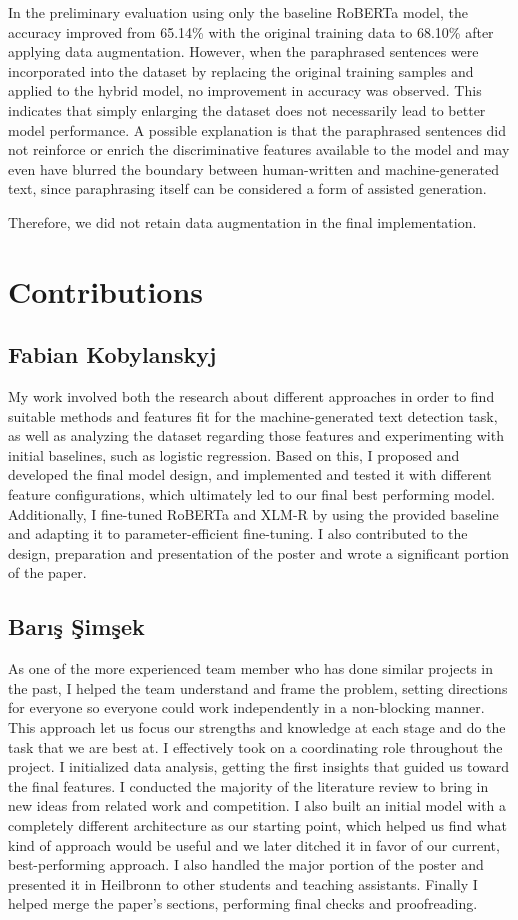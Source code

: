 \documentclass[11pt]{article}
\begin{document}
In the preliminary evaluation using only the baseline RoBERTa model, the accuracy improved from 65.14\% with the original training data to 68.10\% after applying data augmentation. However, when the paraphrased sentences were incorporated into the dataset by replacing the original training samples and applied to the hybrid model, no improvement in accuracy was observed. This indicates that simply enlarging the dataset does not necessarily lead to better model performance. A possible explanation is that the paraphrased sentences did not reinforce or enrich the discriminative features available to the model and may even have blurred the boundary between human-written and machine-generated text, since paraphrasing itself can be considered a form of assisted generation.

Therefore, we did not retain data augmentation in the final implementation.




\section{Contributions}
\subsection{Fabian Kobylanskyj}
My work involved both the research about different approaches in order to find suitable methods and features fit for the machine-generated text detection task, as well as analyzing the dataset regarding those features and experimenting with initial baselines, such as logistic regression. Based on this, I proposed and developed the final model design, and implemented and tested it with different feature configurations, which ultimately led to our final best performing model. Additionally, I fine-tuned RoBERTa and XLM-R by using the provided baseline and adapting it to parameter-efficient fine-tuning.  
I also contributed to the design, preparation and presentation of the poster and wrote a significant portion of the paper.
\subsection{Barı\c{s} \c{S}im\c{s}ek}
As one of the more experienced team member who has done similar projects in the past, I helped the team understand and frame the problem, setting directions for everyone so everyone could work independently in a non-blocking manner. This approach let us focus our strengths and knowledge at each stage and do the task that we are best at. I effectively took on a coordinating role throughout the project. I initialized data analysis, getting the first insights that guided us toward the final features. I conducted the majority of the literature review to bring in new ideas from related work and competition. I also built an initial model with a completely different architecture as our starting point, which helped us find what kind of approach would be useful and we later ditched it in favor of our current, best-performing approach. I also handled the major portion of the poster and presented it in Heilbronn to other students and teaching assistants. Finally I helped merge the paper’s sections, performing final checks and proofreading.
\end{document}
